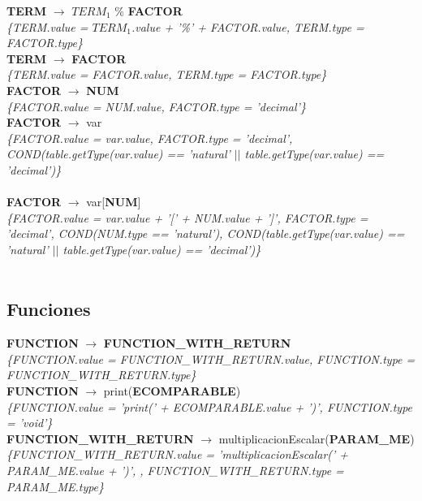 \documentclass[10pt,a4paper]{article}
\begin{document}
\textbf{TERM} $\rightarrow$ \textbf{$TERM_{1}$} \% \textbf{FACTOR}  \\
\textit{\{TERM.value = $TERM_{1}$.value + '\%' + FACTOR.value, TERM.type = FACTOR.type\}} \\

\textbf{TERM} $\rightarrow$ \textbf{FACTOR} \\
\textit{\{TERM.value = FACTOR.value, TERM.type = FACTOR.type\}} \\

\textbf{FACTOR} $\rightarrow$ \textbf{NUM}   \\
\textit{\{FACTOR.value = NUM.value, FACTOR.type = 'decimal'\}} \\

\textbf{FACTOR} $\rightarrow$ var  \\ 
\textit{\{FACTOR.value = var.value, FACTOR.type = 'decimal', COND(table.getType(var.value) == 'natural' $||$ table.getType(var.value) == 'decimal')\}}  \\ 
\\


\textbf{FACTOR} $\rightarrow$ var[\textbf{NUM}]  \\ 
\textit{\{FACTOR.value = var.value + '[' + NUM.value + ']', FACTOR.type = 'decimal', COND(NUM.type == 'natural'), COND(table.getType(var.value) == 'natural' $||$ table.getType(var.value) == 'decimal')\}}  \\ 
\\




\subsection{Funciones}
\textbf{FUNCTION} $\rightarrow$ \textbf{FUNCTION\_WITH\_RETURN} \\
\textit{\{FUNCTION.value =  FUNCTION\_WITH\_RETURN.value, FUNCTION.type = FUNCTION\_WITH\_RETURN.type\}} \\

\textbf{FUNCTION} $\rightarrow$ print(\textbf{ECOMPARABLE}) \\   
\textit{\{FUNCTION.value =  'print(' + ECOMPARABLE.value + ')', FUNCTION.type = 'void'\}} \\

\textbf{FUNCTION\_WITH\_RETURN} $\rightarrow$ multiplicacionEscalar(\textbf{PARAM\_ME}) \\ 
\textit{\{FUNCTION\_WITH\_RETURN.value =  'multiplicacionEscalar(' + PARAM\_ME.value + ')', , FUNCTION\_WITH\_RETURN.type = PARAM\_ME.type\}} \\
\end{document}

